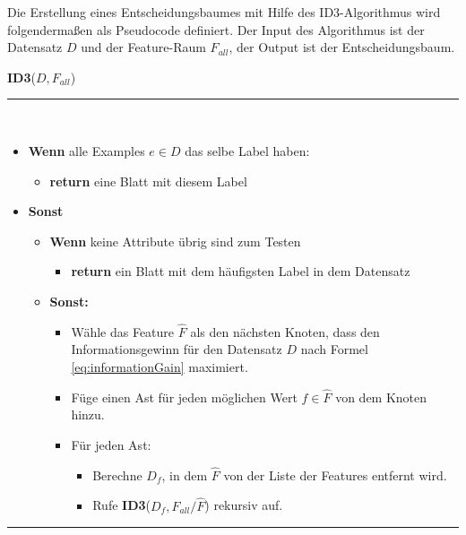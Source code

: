 Die Erstellung eines Entscheidungsbaumes mit Hilfe des ID3-Algorithmus wird folgendermaßen als Pseudocode definiert. Der Input des Algorithmus ist der Datensatz $D$ und der Feature-Raum $F_{all}$, der Output ist der Entscheidungsbaum.\cite[S. 139]{machine_marsland}
\vspace{5mm}

\textbf{ID3}($D,F_{all}$) \noindent\rule{0.83\linewidth}{0.3pt} \\
\begin{itemize}
\item \textbf{Wenn} alle Examples $e \in D$ das selbe Label haben:
	\begin{itemize}
	\item \textbf{return} eine Blatt mit diesem Label
	\end{itemize}
\item \textbf{Sonst}
	\begin{itemize} 
	\item \textbf{Wenn} keine Attribute übrig sind zum Testen
		\begin{itemize}
		\item \textbf{return} ein Blatt mit dem häufigsten Label in dem Datensatz
		\end{itemize}
	\item \textbf{Sonst:} 
		\begin{itemize}
		\item Wähle das Feature $\hat{F}$ als den nächsten Knoten, dass den Informationsgewinn für den Datensatz $D$ nach Formel \ref{eq:informationGain} maximiert.
		\item Füge einen Ast für jeden möglichen Wert $f \in \hat{F}$ von dem Knoten hinzu.
		\item Für jeden Ast:
			\begin{itemize}
			\item Berechne $D_f$, in dem $\hat{F}$ von der Liste der Features entfernt wird.
			\item Rufe \textbf{ID3}($D_f, F_{all} / \hat{F}$) rekursiv auf.
			\end{itemize}
		\end{itemize}
	\end{itemize} 
\end{itemize}

\noindent\rule{\linewidth}{0.3pt}

\vspace{5mm}

